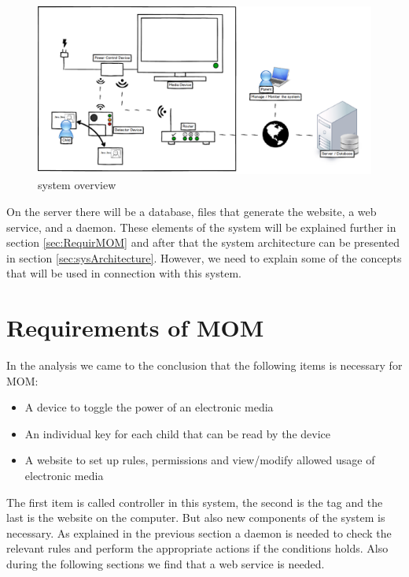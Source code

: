 \begin{figure}
	\centering
		\includegraphics[width=1.00\textwidth]{images/systemoverview2.png}
	\caption{system overview}
	\label{fig:systemoverview}
\end{figure}

On the server there will be a database, files that generate the website, a web service, and a daemon. These elements of the system will be explained further in section \vref{sec:RequirMOM} and after that the system architecture can be presented in section \vref{sec:sysArchitecture}. However, we need to explain some of the concepts that will be used in connection with this system.




\section{Requirements of MOM}
\label{sec:RequirMOM}

In the analysis we came to the conclusion that the following items is necessary for MOM: 
\begin{itemize}
	\item A device to toggle the power of an electronic media
	\item An individual key for each child that can be read by the device
	\item A website to set up rules, permissions and view/modify allowed usage of electronic media
\end{itemize} 


The first item is called controller in this system, the second is the tag and the last is the website on the computer. But also new components of the system is necessary. As explained in the previous section a daemon is needed to check the relevant rules and perform the appropriate actions if the conditions holds. Also during the following sections we find that a web service is needed. 

